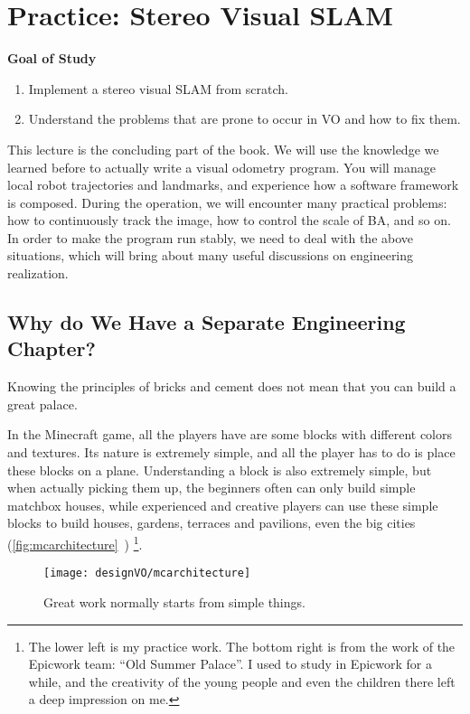 \chapter{Practice: Stereo Visual SLAM}
\begin{mdframed}  
	\textbf{Goal of Study}
	\begin{enumerate}[labelindent=0em,leftmargin=1.5em]
	\item Implement a stereo visual SLAM from scratch.
	\item Understand the problems that are prone to occur in VO and how to fix them.
	\end{enumerate}
\end{mdframed}

This lecture is the concluding part of the book. We will use the knowledge we learned before to actually write a visual odometry program. You will manage local robot trajectories and landmarks, and experience how a software framework is composed. During the operation, we will encounter many practical problems: how to continuously track the image, how to control the scale of BA, and so on. In order to make the program run stably, we need to deal with the above situations, which will bring about many useful discussions on engineering realization.

\newpage
\section{Why do We Have a Separate Engineering Chapter?}
Knowing the principles of bricks and cement does not mean that you can build a great palace.

In the Minecraft game, all the players have are some blocks with different colors and textures. Its nature is extremely simple, and all the player has to do is place these blocks on a plane. Understanding a block is also extremely simple, but when actually picking them up, the beginners often can only build simple matchbox houses, while experienced and creative players can use these simple blocks to build houses, gardens, terraces and pavilions, even the big cities (\autoref{fig:mcarchitecture}~) \footnote{The lower left is my practice work. The bottom right is from the work of the Epicwork team: ``Old Summer Palace''. I used to study in Epicwork for a while, and the creativity of the young people and even the children there left a deep impression on me. }.

\begin{figure}[!htp]
	\centering    
	\texttt{[image: designVO/mcarchitecture]}\\
	\caption{Great work normally starts from simple things.}
	\label{fig:mcarchitecture}
\end{figure}

